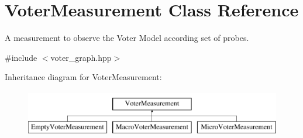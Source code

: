 \hypertarget{classVoterMeasurement}{\section{Voter\-Measurement Class Reference}
\label{classVoterMeasurement}
}


A measurement to observe the Voter Model according set of probes.  




{\ttfamily \#include $<$voter\-\_\-graph.\-hpp$>$}

Inheritance diagram for Voter\-Measurement\-:\begin{figure}[H]
\begin{center}
\leavevmode
\includegraphics[height=2.000000cm]{classVoterMeasurement}
\end{center}
\end{figure}
